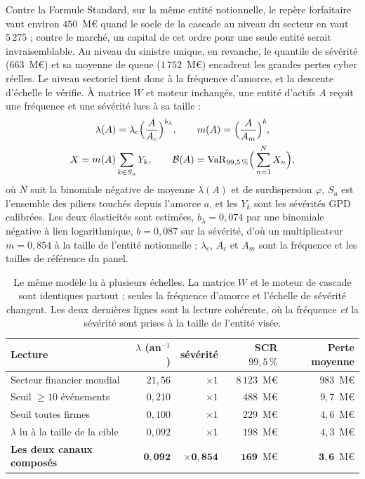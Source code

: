 Contre la Formule Standard, sur la même entité notionnelle, le repère forfaitaire vaut environ
$450$~M\euro{} quand le socle de la cascade au niveau du secteur en vaut $5\,275$ ; contre le
marché, un capital de cet ordre pour une seule entité serait invraisemblable. Au niveau du
sinistre unique, en revanche, le quantile de sévérité ($663$~M\euro) et sa moyenne de queue
($1\,752$~M\euro) encadrent les grandes pertes cyber réelles. Le niveau sectoriel tient donc à la
fréquence d'amorce, et la descente d'échelle le vérifie. À matrice $W$ et moteur inchangés, une
entité d'actifs $A$ reçoit une fréquence et une sévérité lues à sa taille :
\begin{equation}\label{eq:descente}
\begin{gathered}
\lambda(A)=\lambda_c\Big(\frac{A}{A_c}\Big)^{b_\lambda},\qquad
m(A)=\Big(\frac{A}{A_m}\Big)^{b},\\
X=m(A)\sum_{k\in S_a}Y_k,\qquad
\mathcal{B}(A)=\mathrm{VaR}_{99{,}5\,\%}\Big(\sum_{n=1}^{N}X_n\Big),
\end{gathered}
\end{equation}
où $N$ suit la binomiale négative de moyenne $\lambda(A)$ et de surdispersion $\varphi$, $S_a$ est
l'ensemble des piliers touchés depuis l'amorce $a$, et les $Y_k$ sont les sévérités GPD calibrées.
Les deux élasticités sont estimées, $b_\lambda = 0{,}074$ par une binomiale négative à lien
logarithmique, $b = 0{,}087$ sur la sévérité, d'où un multiplicateur $m = 0{,}854$ à la taille de
l'entité notionnelle ; $\lambda_c$, $A_c$ et $A_m$ sont la fréquence et les tailles de référence du
panel.

\begin{table}[htbp]\centering
\small
\begin{tabular}{lrrrr}
\toprule
Lecture & $\lambda$ (an$^{-1}$) & sévérité & SCR $99{,}5\,\%$ & Perte moyenne \\
\midrule
Secteur financier mondial & $21{,}56$ & $\times 1$ & $8\,123$~M\euro & $983$~M\euro \\
Seuil \og{}$\geq 10$ événements\fg{} & $0{,}210$ & $\times 1$ & $488$~M\euro & $9{,}7$~M\euro \\
Seuil \og{}toutes firmes\fg{} & $0{,}100$ & $\times 1$ & $229$~M\euro & $4{,}6$~M\euro \\
$\lambda$ lu à la taille de la cible & $0{,}092$ & $\times 1$ & $198$~M\euro & $4{,}3$~M\euro \\
\textbf{Les deux canaux composés} & $\mathbf{0{,}092}$ & $\mathbf{\times 0{,}854}$ &
$\mathbf{169}$~M\euro & $\mathbf{3{,}6}$~M\euro \\
\bottomrule
\end{tabular}
\caption{Le même modèle lu à plusieurs échelles. La matrice $W$ et le moteur de cascade sont
identiques partout ; seules la fréquence d'amorce et l'échelle de sévérité changent. Les deux
dernières lignes sont la lecture cohérente, où la fréquence \emph{et} la sévérité sont prises
à la taille de l'entité visée.}
\label{tab:echelle}
\end{table}

